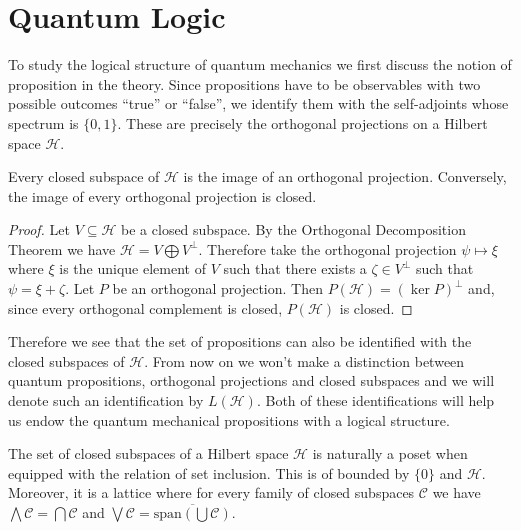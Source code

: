 \section{Quantum Logic}\label{sec:Q_logic}

To study the logical structure of quantum mechanics we first discuss the notion of proposition in the theory. Since propositions have to be observables with two possible outcomes ``true'' or ``false'', we identify them with the self-adjoints whose spectrum is $\{0,1\}$. These are precisely the orthogonal projections on a Hilbert space $\mathcal{H}$.

\begin{theorem}
Every closed subspace of $\mathcal{H}$ is the image of an orthogonal projection. Conversely, the image of every orthogonal projection is closed.
\end{theorem}
\begin{proof}
Let $V\subseteq\mathcal{H}$ be a closed subspace.  By the Orthogonal Decomposition Theorem we have $\mathcal{H}=V\bigoplus V^{\bot}$. Therefore take the orthogonal projection $\psi\mapsto\xi$ where $\xi$ is the unique element of $V$ such that there exists a $\zeta\in V^{\bot}$ such that $\psi=\xi+\zeta$.
Let $P$ be an orthogonal projection. Then $P(\mathcal{H})=(\ker P)^{\bot}$ and, since every orthogonal complement is closed, $P(\mathcal{H})$ is closed.
\end{proof}

Therefore we see that the set of propositions can also be identified with the closed subspaces of $\mathcal{H}$. From now on we won't make a distinction between quantum propositions, orthogonal projections and closed subspaces and we will denote such an identification by $L(\mathcal{H})$. Both of these identifications will help us endow the quantum mechanical propositions with a logical structure.

\begin{theorem}\label{thm:quantum_complements}
The set of closed subspaces of a Hilbert space $\mathcal{H}$ is naturally a poset when equipped with the relation of set inclusion. This is of bounded by $\{0\}$ and $\mathcal{H}$. Moreover, it is a lattice where for every family of closed subspaces $\mathcal{C}$ we have $\bigwedge \mathcal{C} = \bigcap \mathcal{C}$ and $\bigvee \mathcal{C} = \overline{\text{span}\left(\bigcup\mathcal{C}\right)}$.
\end{theorem}

